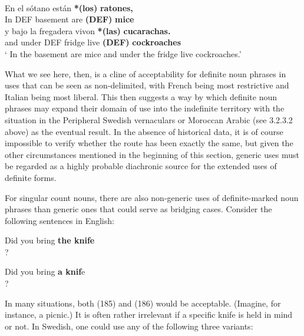 \z

\ea \label{} 
\\
\gll En  el  sótano  están  \textbf{*(los)} \textbf{  ratones,}\\
In  DEF  basement  are  \textbf{(DEF)} \textbf{mice}\\
\gll y  bajo  la  fregadera  vivon  \textbf{*(las)} \textbf{cucarachas.}\\
and  under  DEF  fridge  live  \textbf{(DEF)} \textbf{cockroaches}\\
\glt ‘ In the basement are mice and under the fridge live cockroaches.’  

\z

What we see here, then, is a cline of acceptability for definite noun phrases in uses that can be seen as non-delimited, with French being most restrictive and Italian being most liberal. This then suggests a way by which definite noun phrases may expand their domain of use into the indefinite territory with the situation in the Peripheral Swedish vernaculars or Moroccan Arabic (see 3.2.3.2 above) as the eventual result. In the absence of historical data, it is of course impossible to verify whether the route has been exactly the same, but given the other circumstances mentioned in the beginning of this section, generic uses must be regarded as a highly probable diachronic source for the extended uses of definite forms. 


For singular count nouns, there are also non-generic uses of definite-marked noun phrases than generic ones that could serve as bridging cases. Consider the following sentences in English:


\ea
\gl \label{bkm:Ref123724733}Did you bring \textbf{the knife}\\?
\z 

\ea 
\gl \label{bkm:Ref123724734}Did you bring \textbf{a knif}e\\?
\z 

In many situations, both (185) and (186) would be acceptable. (Imagine, for instance, a picnic.) It is often rather irrelevant if a specific knife is held in mind or not. In Swedish, one could use any of the following three variants:

